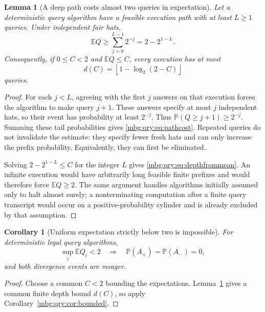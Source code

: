 \documentclass[11pt,letterpaper]{article}
\newtheorem{lemma}[theorem]{Lemma}
\newtheorem{corollary}[theorem]{Corollary}
\theoremstyle{definition}
\newcommand{\E}{\mathbb E}
\newcommand{\Prb}{\mathbb P}
\begin{document}
\begin{lemma}[A deep path costs almost two queries in expectation]
\label{mbg:qry:lem:pathcost}
Let a deterministic query algorithm have a feasible execution path with
at least \(L\ge1\) queries. Under independent fair hats,
\begin{equation}
 \E Q\ge\sum_{j=0}^{L-1}2^{-j}=2-2^{1-L}.
 \label{mbg:qry:eq:pathcost}
\end{equation}
Consequently, if \(0\le C<2\) and \(\E Q\le C\), every execution has at
most
\begin{equation}
 d(C)=\left\lfloor1-\log_2(2-C)\right\rfloor
 \label{mbg:qry:eq:depthfrommean}
\end{equation}
queries.
\end{lemma}

\begin{proof}
For each \(j<L\), agreeing with the first \(j\) answers on that execution
forces the algorithm to make query \(j+1\). These answers specify at most
\(j\) independent hats, so their event has probability at least \(2^{-j}\).
Thus \(\Prb(Q\ge j+1)\ge2^{-j}\). Summing these tail probabilities gives
\eqref{mbg:qry:eq:pathcost}. Repeated queries do not invalidate the estimate:
they specify fewer fresh hats and can only increase the prefix
probability. Equivalently, they can first be eliminated.

Solving \(2-2^{1-L}\le C\) for the integer \(L\) gives
\eqref{mbg:qry:eq:depthfrommean}. An infinite execution would have arbitrarily
long feasible finite prefixes and would therefore force \(\E Q\ge2\).
The same argument handles algorithms initially assumed only to halt
almost surely; a nonterminating computation after a finite query
transcript would occur on a positive-probability cylinder and is already
excluded by that assumption.
\end{proof}

\begin{corollary}[Uniform expectation strictly below two is impossible]
\label{mbg:qry:cor:meanlower}
For deterministic legal query algorithms,
\[
 \sup_i\E Q_i<2
 \quad\Longrightarrow\quad
 \Prb(A_+)=\Prb(A_-)=0,
\]
and both divergence events are meager.
\end{corollary}

\begin{proof}
Choose a common \(C<2\) bounding the expectations. Lemma~\ref{mbg:qry:lem:pathcost}
gives a common finite depth bound \(d(C)\), so apply
Corollary~\ref{mbg:qry:cor:bounded}.
\end{proof}
\end{document}
